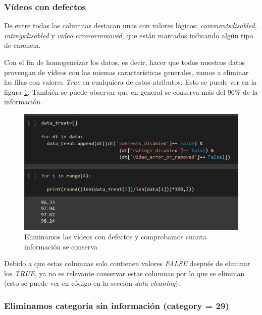 \documentclass[a4paper,12pt]{article}
\begin{document}
\subsubsection{V\'ideos con defectos}

De entre todas las columnas destacan unas con valores l\'ogicos:  {\itshape comments{\textunderscore}disabled}, {\itshape ratings{\textunderscore}disabled} y {\itshape video {\textunderscore}error{\textunderscore}or{\textunderscore}removed}, que est\'an marcados indicando alg\'un tipo de carencia. 

Con el fin de homogeneizar los datos, es decir, hacer que todos nuestros datos provengan de v\'ideos con las mismas caracter\'isticas generales, vamos a eliminar las filas con valores {\itshape True} en cualquiera de estos atributos. Esto se puede ver en la figura \ref{fig:defect}. Tambi\'en se puede observar que en general se conserva m\'as del $96\%$ de la informaci\'on. 


\begin{figure}[h!]
\centering
\includegraphics[width=13cm]{data_selection_2.JPG}
\caption{Eliminamos las v\'ideos con defectos y comprobamos cuanta informaci\'on se conserva}
\label{fig:defect}
\end{figure}




Debido a que estas columnas solo contienen valores {\itshape FALSE} despu\'es de eliminar los {\itshape TRUE}, ya no es relevante conservar estas columnas por lo que se eliminan (esto se puede ver en c\'odigo en la secci\'on {\itshape data cleaning}).

\subsubsection{Eliminamos categor\'ia sin informaci\'on (category = 29)}
\end{document}
